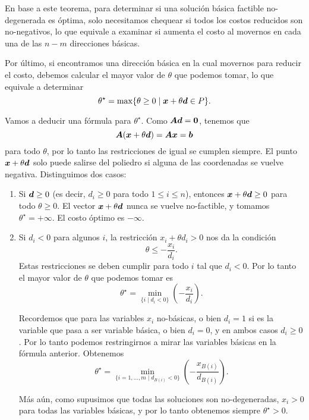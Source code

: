 En base a este teorema, para determinar si una solución básica factible no-degenerada es óptima, solo necesitamos chequear si todos los costos reducidos son no-negativos, lo que equivale a examinar si aumenta el costo al movernos en cada una de las $n - m$ direcciones básicas.

Por último, si encontramos una dirección básica en la cual movernos para reducir el costo, debemos calcular el mayor valor de $\theta$ que podemos tomar, lo que equivale a determinar
$$
\theta^\star = \max\{\theta \ge 0 \mid \bm{x} + \theta \bm{d} \in P\}.
$$

Vamos a deducir una fórmula para $\theta^\star$. Como $\bm{A} \bm{d} = \bm{0}$, tenemos que
$$
\bm{A} (\bm{x} + \theta \bm{d}) = \bm{A} \bm{x} = \bm{b}
$$
para todo $\theta$, por lo tanto las restricciones de igual se cumplen siempre. El punto $\bm{x} + \theta \bm{d}$ solo puede salirse del poliedro si alguna de las coordenadas se vuelve negativa. Distinguimos dos casos:

\begin{enumerate}
\item Si $\bm{d} \ge 0$ (es decir, $d_i \ge 0$ para todo $1 \le i \le n$), entonces $\bm{x} + \theta \bm{d} \ge 0$ para todo $\theta \ge 0$. El vector $\bm{x} + \theta \bm{d}$ nunca se vuelve no-factible, y tomamos $\theta^\star = +\infty$. El costo óptimo es $-\infty$.

\item Si $d_i < 0$ para algunos $i$, la restricción $x_i + \theta d_i > 0$ nos da la condición
$$
\theta \le -\frac{x_i}{d_i}.
$$
Estas restricciones se deben cumplir para todo $i$ tal que $d_i < 0$. Por lo tanto el mayor valor de $\theta$ que podemos tomar es
\begin{equation*}
\theta^\star = \min_{\{i \mid d_i < 0 \}}\left(-\frac{x_i}{d_i}\right).
\end{equation*}

Recordemos que para las variables $x_i$ no-básicas, o bien $d_i = 1$ si es la variable que pasa a ser variable básica, o bien $d_i = 0$, y en ambos casos $d_i \ge 0$. Por lo tanto podemos restringirnos a mirar las variables básicas en la fórmula anterior. Obtenemos
\begin{equation}
\label{eq:thetastar}
\theta^\star = \min_{\{i = 1, \dots, m \mid d_{B(i)} < 0 \}}\left(-\frac{x_{B(i)}}{d_{B(i)}}\right).
\end{equation}

Más aún, como supusimos que todas las soluciones son no-degeneradas, $x_i > 0$ para todas las variables básicas, y por lo tanto obtenemos siempre $\theta^\star > 0$.
\end{enumerate}

